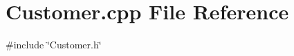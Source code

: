 \section{Customer.\+cpp File Reference}
\label{Customer_8cpp}
{\ttfamily \#include \char`\"{}Customer.\+h\char`\"{}}\newline
